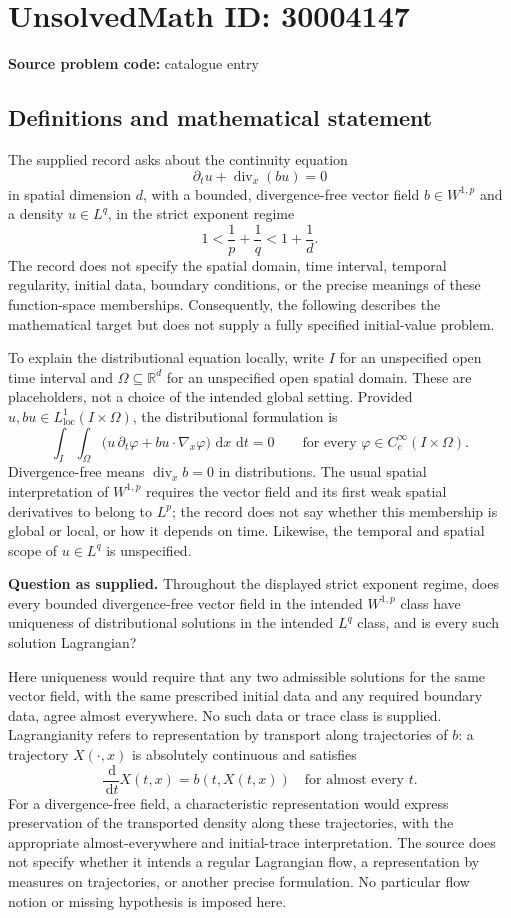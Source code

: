 \documentclass[11pt]{article}
\newcommand{\R}{\mathbb{R}}
\newcommand{\dd}{\,\mathrm{d}}
\begin{document}
\section*{UnsolvedMath ID: 30004147}
\textbf{Source problem code:} catalogue entry
\subsection{Definitions and mathematical statement}
The supplied record asks about the continuity equation
\[
\partial_t u+\operatorname{div}_x(bu)=0
\]
in spatial dimension \(d\), with a bounded, divergence-free vector field \(b\in W^{1,p}\) and a density \(u\in L^q\), in the strict exponent regime
\[
1<\frac1p+\frac1q<1+\frac1d.
\]
The record does not specify the spatial domain, time interval, temporal regularity, initial data, boundary conditions, or the precise meanings of these function-space memberships. Consequently, the following describes the mathematical target but does not supply a fully specified initial-value problem.

To explain the distributional equation locally, write \(I\) for an unspecified open time interval and \(\Omega\subseteq\R^d\) for an unspecified open spatial domain. These are placeholders, not a choice of the intended global setting. Provided \(u,bu\in L^1_{\mathrm{loc}}(I\times\Omega)\), the distributional formulation is
\[
\int_I\int_\Omega \bigl(u\,\partial_t\varphi+bu\cdot\nabla_x\varphi\bigr)\,\dd x\,\dd t=0
\qquad\text{for every }\varphi\in C_c^\infty(I\times\Omega).
\]
Divergence-free means \(\operatorname{div}_x b=0\) in distributions. The usual spatial interpretation of \(W^{1,p}\) requires the vector field and its first weak spatial derivatives to belong to \(L^p\); the record does not say whether this membership is global or local, or how it depends on time. Likewise, the temporal and spatial scope of \(u\in L^q\) is unspecified.

\textbf{Question as supplied.} Throughout the displayed strict exponent regime, does every bounded divergence-free vector field in the intended \(W^{1,p}\) class have uniqueness of distributional solutions in the intended \(L^q\) class, and is every such solution Lagrangian?

Here uniqueness would require that any two admissible solutions for the same vector field, with the same prescribed initial data and any required boundary data, agree almost everywhere. No such data or trace class is supplied. Lagrangianity refers to representation by transport along trajectories of \(b\): a trajectory \(X(\cdot,x)\) is absolutely continuous and satisfies
\[
\frac{\dd}{\dd t}X(t,x)=b(t,X(t,x))
\quad\text{for almost every }t.
\]
For a divergence-free field, a characteristic representation would express preservation of the transported density along these trajectories, with the appropriate almost-everywhere and initial-trace interpretation. The source does not specify whether it intends a regular Lagrangian flow, a representation by measures on trajectories, or another precise formulation. No particular flow notion or missing hypothesis is imposed here.
\end{document}
